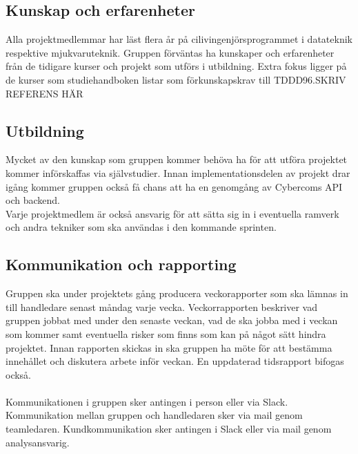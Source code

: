 \subsection{Kunskap och erfarenheter}
Alla projektmedlemmar har läst flera år på cilivingenjörsprogrammet i datateknik respektive mjukvaruteknik. Gruppen förväntas ha kunskaper och erfarenheter från de tidigare kurser och projekt som utförs i utbildning. Extra fokus ligger på de kurser som studiehandboken listar som förkunskapskrav till TDDD96.SKRIV REFERENS HÄR


\subsection{Utbildning}
Mycket av den kunskap som gruppen kommer behöva ha för att utföra projektet kommer införskaffas via självstudier. Innan implementationsdelen av projekt drar igång kommer gruppen också få chans att ha en genomgång av Cybercoms API och backend.
\\
Varje projektmedlem är också ansvarig för att sätta sig in i eventuella ramverk och andra tekniker som ska användas i den kommande sprinten.

\subsection{Kommunikation och rapporting}
Gruppen ska under projektets gång producera veckorapporter som ska lämnas in till handledare senast måndag varje vecka. Veckorrapporten beskriver vad gruppen jobbat med under den senaste veckan, vad de ska jobba med i veckan som kommer samt eventuella risker som finns som kan på något sätt hindra projektet. Innan rapporten skickas in ska gruppen ha möte för att bestämma innehållet och diskutera arbete inför veckan. En uppdaterad tidsrapport bifogas också.\\
\\
Kommunikationen i gruppen sker antingen i person eller via Slack. Kommunikation mellan gruppen och handledaren sker via mail genom teamledaren. Kundkommunikation sker antingen i Slack eller via mail genom analysansvarig.

\pagebreak
